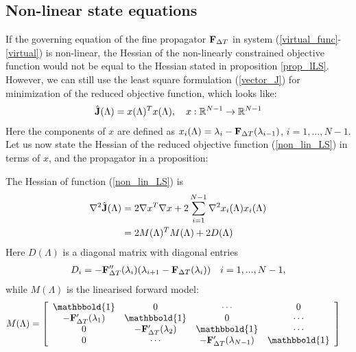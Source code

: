 \subsection{Non-linear state equations}
If the governing equation of the fine propagator $\bold F_{\Delta T}$ in system (\ref{virtual_func}-\ref{virtual}) is non-linear, the Hessian of the non-linearly constrained objective function would not be equal to the Hessian stated in proposition \ref{prop_lLS}. However, we can still use the least square formulation (\ref{vector_J}) for minimization of the reduced objective function, which looks like: 
\begin{align}
\hat{\bold J}(\Lambda) = x(\Lambda)^Tx(\Lambda), \quad x:\mathbb{R}^{N-1}\rightarrow \mathbb{R}^{N-1} \label{non_lin_LS}
\end{align} 
Here the components of $x$ are defined as $x_i(\Lambda)=\lambda_{i}-\bold F_{\Delta T}(\lambda_{i-1})$, $i=1,...,N-1$. Let us now state the Hessian of the reduced objective function (\ref{non_lin_LS}) in terms of $x$, and the propagator in a proposition:
\begin{proposition}\label{NonLin_prop}
The Hessian of function (\ref{non_lin_LS}) is
\begin{align*}
\nabla^2 \hat{\bold J}(\Lambda) &= 2\nabla x^T\nabla x + 2\sum_{i=1}^{N-1} \nabla^2 x_i(\Lambda) x_i(\Lambda)\\
&=2M(\Lambda)^TM(\Lambda) + 2D(\Lambda)
\end{align*}
Here $D(\Lambda)$ is a diagonal matrix with diagonal entries 
\begin{align*}
D_i=-\bold{F}_{\Delta T}''(\lambda_i)(\lambda_{i+1}-\bold F_{\Delta T}(\lambda_i)) \quad i=1,...,N-1,
\end{align*}
while $M(\Lambda)$ is the linearised forward model:
\begin{align*}
M(\Lambda) &= \left[ \begin{array}{cccc}
   \mathbbold{1} & 0 & \cdots & 0 \\  
   -\bold{F}_{\Delta T}'(\lambda_{1}) & \mathbbold{1} & 0 & \cdots \\ 
   0 &-\bold{F}_{\Delta T}'(\lambda_{2}) & \mathbbold{1}  & \cdots \\
   0 &\cdots &-\bold{F}_{\Delta T}'(\lambda_{N-1}) & \mathbbold{1}  \\
   \end{array}  \right]
\end{align*}	
\end{proposition}

